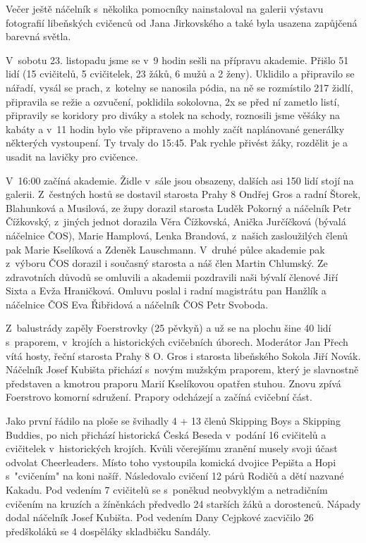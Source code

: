 \documentclass[11pt]{article}
\begin{document}
Večer ještě náčelník s~několika pomocníky nainstaloval na galerii výstavu fotografií libeňských cvičenců od Jana Jirkovského a také byla usazena zapůjčená barevná světla.

V~sobotu 23. listopadu jsme se v~9 hodin sešli na přípravu akademie. Přišlo 51 lidí (15 cvičitelů, 5 cvičitelek, 23 žáků, 6 mužů a 2 ženy). Uklidilo a připravilo se nářadí, vysál se prach, z~kotelny se nanosila pódia, na ně se rozmístilo 217 židlí, připravila se režie a ozvučení, poklidila sokolovna, 2x se před ní zametlo listí, připravily se koridory pro diváky a stolek na schody, roznosili jsme věšáky na kabáty a v~11 hodin bylo vše připraveno a mohly začít naplánované generálky některých vystoupení. Ty trvaly do 15:45. Pak rychle přivést žáky, rozdělit je a usadit na lavičky pro cvičence.

V~16:00 začíná akademie. Židle v~sále jsou obsazeny, dalších asi 150 lidí stojí na galerii. Z~čestných hostů se dostavil starosta Prahy 8 Ondřej Gros a radní Štorek, Blahunková a Musilová, ze župy dorazil starosta Luděk Pokorný a náčelník Petr Čížkovský, z~jiných jednot dorazila Věra Čížkovská, Anička Jurčíčková (bývalá náčelnice ČOS), Marie Hamplová, Lenka Brandová, z~našich zasloužilých členů pak Marie Kselíková a Zdeněk Lauschmann. V~druhé půlce akademie pak z~výboru ČOS dorazil i současný starosta a náš člen Martin Chlumský. Ze zdravotních důvodů se omluvili a akademii pozdravili naši bývalí členové Jiří Sixta a Evža Hraničková. Omluvu poslal i radní magistrátu pan Hanžlík a náčelnice ČOS Eva Řibřidová a náčelník ČOS Petr Svoboda. 

Z~balustrády zapěly Foerstrovky (25 pěvkyň) a už se na plochu šine 40 lidí s~praporem, v~krojích a historických cvičebních úborech. Moderátor Jan Přech vítá hosty, řeční starosta Prahy 8 O. Gros i starosta libeňského Sokola Jiří Novák. Náčelník Josef Kubišta přichází s~novým mužským praporem, který je slavnostně představen a kmotrou praporu Marií Kselíkovou opatřen stuhou. Znovu zpívá Foerstrovo komorní sdružení. Prapory odcházejí a začíná cvičební část. 

Jako první řádilo na ploše se švihadly 4 + 13 členů Skipping Boys a Skipping Buddies, po nich přichází historická Česká Beseda v~podání 16 cvičitelů a cvičitelek v~historických krojích. Kvůli včerejšímu zranění musely svoji účast odvolat Cheerleaders. Místo toho vystoupila komická dvojice Pepišta a Hopi s~"cvičením" na koni našíř. Následovalo cvičení 12 párů Rodičů a dětí nazvané Kakadu. Pod vedením 7 cvičitelů se s~poněkud neobvyklým a netradičním cvičením na kruzích a žíněnkách předvedlo 24 starších žáků a dorostenců. Nápady dodal náčelník Josef Kubišta. Pod vedením Dany Cejpkové zacvičilo 26 předškoláků se 4 dospěláky skladbičku Sandály.
\end{document}
